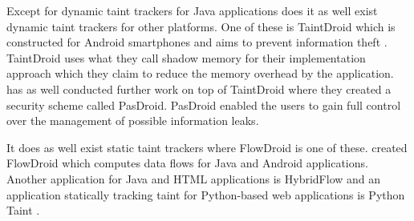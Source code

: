 Except for dynamic taint trackers for Java applications does it as well exist dynamic taint trackers for other platforms. One of these is TaintDroid which is constructed for Android smartphones and aims to prevent information theft \parencite{EnckWilliam2014Taif}. TaintDroid uses what they call shadow memory for their implementation approach which they claim to reduce the memory overhead by the application. \textcite{HsiaoS.W.2014PRse} has as well conducted further work on top of TaintDroid where they created a security scheme called PasDroid. PasDroid enabled the users to gain full control over the management of possible information leaks.

It does as well exist static taint trackers where FlowDroid is one of these. \textcite{ArztS.2014FPcf} created FlowDroid which computes data flows for Java and Android applications. Another application for Java and HTML applications is HybridFlow \parencite{HybridFlow} and an application statically tracking taint for Python-based web applications is Python Taint \parencite{PythonTaint}.
